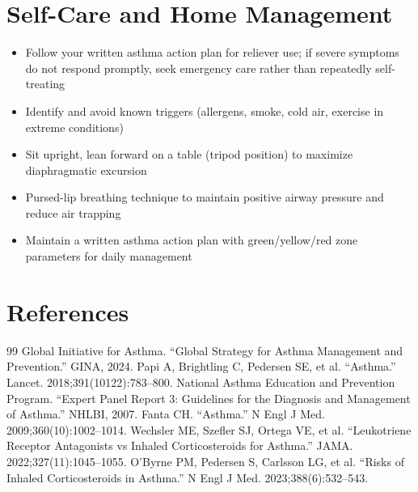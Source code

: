 \section*{Self-Care and Home Management}
\begin{itemize}
 \item Follow your written asthma action plan for reliever use; if severe symptoms do not respond promptly, seek emergency care rather than repeatedly self-treating
 \item Identify and avoid known triggers (allergens, smoke, cold air, exercise in extreme conditions)
 \item Sit upright, lean forward on a table (tripod position) to maximize diaphragmatic excursion
 \item Pursed-lip breathing technique to maintain positive airway pressure and reduce air trapping
 \item Maintain a written asthma action plan with green/yellow/red zone parameters for daily management
\end{itemize}

\section*{References}
\begin{thebibliography}{99}
 Global Initiative for Asthma. ``Global Strategy for Asthma Management and Prevention.'' GINA, 2024.
 Papi A, Brightling C, Pedersen SE, et al. ``Asthma.'' Lancet. 2018;391(10122):783--800.
 National Asthma Education and Prevention Program. ``Expert Panel Report 3: Guidelines for the Diagnosis and Management of Asthma.'' NHLBI, 2007.
 Fanta CH. ``Asthma.'' N Engl J Med. 2009;360(10):1002--1014.
 Wechsler ME, Szefler SJ, Ortega VE, et al. ``Leukotriene Receptor Antagonists vs Inhaled Corticosteroids for Asthma.'' JAMA. 2022;327(11):1045--1055.
 O'Byrne PM, Pedersen S, Carlsson LG, et al. ``Risks of Inhaled Corticosteroids in Asthma.'' N Engl J Med. 2023;388(6):532--543.
\end{thebibliography}
